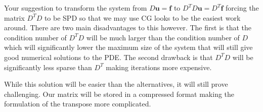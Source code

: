 \documentclass[12pt]{article}
\let\vec\mathbf
\begin{document}
	Your suggestion to transform the system from $D\vec{u} = \vec{f}$ to $D^TD\vec{u} = D^T\vec{f}$ forcing the matrix $D^TD$ to be SPD so that we may use CG looks to be the easiest work around. There are two main disadvantages to this however. The first is that the condition number of $D^TD$ will be much larger than the condition number of $D$ which will significantly lower the maximum size of the system that will still give good numerical solutions to the PDE. The second drawback is that $D^TD$ will be significantly less sparse than $D^T$ making iterations more expensive.
	
	While this solution will be easier than the alternatives, it will still prove challenging. Our matrix will be stored in a compressed format making the formulation of the transpose more complicated.
	
\pagebreak
 
\printbibliography
\end{document}
